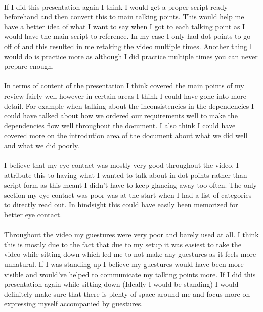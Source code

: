 \documentclass[11pt, a4paper]{article}
\begin{document}
	\paragraph{} {If I did this presentation again I think I would get a proper script ready beforehand and then convert this to main talking points. This would help me have a better idea of what I want to say when I got to each talking point as I would have the main script to reference. In my case I only had dot points to go off of and this resulted in me retaking the video multiple times. Another thing I would do is practice more as although I did practice multiple times you can never prepare enough.}
	
	\paragraph{} {In terms of content of the presentation I think covered the main points of my review fairly well however in certain areas I think I could have gone into more detail. For example when talking about the inconsistencies in the dependencies I could have talked about how we ordered our requirements well to make the dependencies flow well throughout the document. I also think I could have covered more on the introdution area of the document about what we did well and what we did poorly. }
	
	\paragraph{} {I believe that my eye contact was mostly very good throughout the video. I attribute this to having what I wanted to talk about in dot points rather than script form as this meant I didn't have to keep glancing away too often. The only section my eye contact was poor was at the start when I had a list of categories to directly read out. In hindsight this could have easily been memorized for better eye contact.}
	
	\paragraph{} {Throughout the video my guestures were very poor and barely used at all. I think this is mostly due to the fact that due to my setup it was easiest to take the video while sitting down which led me to not make any guestures as it feels more unnatural. If I was standing up I believe my guestures would have been more visible and would've helped to communicate my talking points more. If I did this presentation again while sitting down (Ideally I would be standing) I would definitely make sure that there is plenty of space around me and focus more on expressing myself accompanied by guestures. }
	
\end{document}
